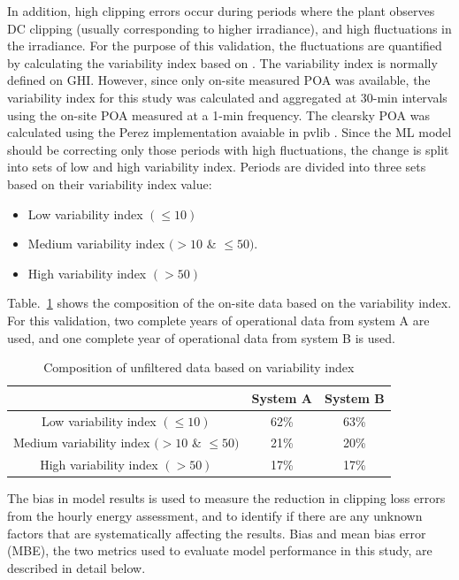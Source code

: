 \documentclass[conference]{IEEEtran}
\begin{document}
In addition, high clipping errors occur during periods where the plant observes DC clipping (usually corresponding to higher irradiance), and high fluctuations in the irradiance. For the purpose of this validation, the fluctuations are quantified by calculating the variability index based on \cite{Stein}. The variability index is normally defined on GHI. However, since only on-site measured POA was available, the variability index for this study was calculated and aggregated at 30-min intervals using the on-site POA measured at a 1-min frequency. The clearsky POA was calculated using the Perez implementation avaiable in pvlib \cite{Holmgren2018}. Since the ML model should be correcting only those periods with  high fluctuations, the change is split into sets of low and high variability index. Periods are divided into three sets based on their variability index value:
\begin{itemize}
\item Low variability index  $(\leq10)$ 
\item Medium variability index  $(>10$ \& $\leq50)$. 
\item High variability index $(>50)$
\end{itemize}
Table.~\ref{var_index_breakdown} shows the composition of the on-site data based on the variability index. For this validation, two complete years of operational data from system A are used, and one complete year of operational data from system B is used.


\begin{table}[htbp]
\caption{Composition of unfiltered data based on variability index}
\begin{center}
\begin{tabular}{ |c|c|c| } 
\hline
& System A & System B \\
\hline
Low variability index $(\leq10)$ & 62\% & 63\% \\
\hline
Medium variability index $(>10$ \& $\leq50)$ & 21\% & 20\% \\
\hline
High variability index $(>50)$ & 17\% & 17\% \\
\hline
\end{tabular}
\end{center}
\label{var_index_breakdown}
\end{table}


The bias in model results is used to measure the reduction in clipping loss errors from the hourly energy assessment, and to identify if there are any unknown factors that are systematically affecting the results. Bias and mean bias error (MBE), the two metrics used to evaluate model performance in this study, are described in detail below.
\end{document}
